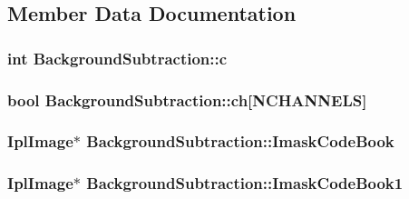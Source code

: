 \subsection{Member Data Documentation}
\hypertarget{classBackgroundSubtraction_a3a6df6ed6dfe3c6fca3a7a792437dd4e}{
\subsubsection[{c}]{\setlength{\rightskip}{0pt plus 5cm}int {\bf BackgroundSubtraction::c}}}
\label{classBackgroundSubtraction_a3a6df6ed6dfe3c6fca3a7a792437dd4e}
\hypertarget{classBackgroundSubtraction_ad02b87592657e60f8de9a1bc9c39e800}{
\subsubsection[{ch}]{\setlength{\rightskip}{0pt plus 5cm}bool {\bf BackgroundSubtraction::ch}\mbox{[}{\bf NCHANNELS}\mbox{]}}}
\label{classBackgroundSubtraction_ad02b87592657e60f8de9a1bc9c39e800}
\hypertarget{classBackgroundSubtraction_af1e341ed6cefb35db5e493918eb778b1}{
\subsubsection[{ImaskCodeBook}]{\setlength{\rightskip}{0pt plus 5cm}IplImage$\ast$ {\bf BackgroundSubtraction::ImaskCodeBook}}}
\label{classBackgroundSubtraction_af1e341ed6cefb35db5e493918eb778b1}
\hypertarget{classBackgroundSubtraction_a7f3f8f3c19033b0450def1fac0c70c93}{
\subsubsection[{ImaskCodeBook1}]{\setlength{\rightskip}{0pt plus 5cm}IplImage$\ast$ {\bf BackgroundSubtraction::ImaskCodeBook1}}}
